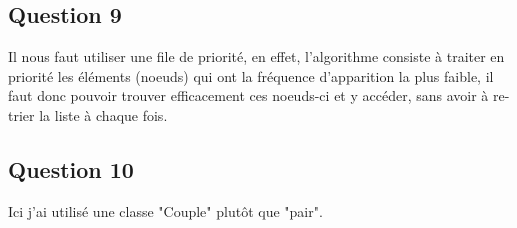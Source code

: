 \documentclass{article}
\begin{document}
\subsection*{Question 9}
Il nous faut utiliser une file de priorité, en effet, l'algorithme consiste à traiter en priorité les éléments (noeuds) qui ont la fréquence d'apparition la plus faible, il faut donc pouvoir trouver efficacement ces noeuds-ci et y accéder, sans avoir à re-trier la liste à chaque fois.

\subsection{Question 10}
Ici j'ai utilisé une classe "Couple" plutôt que "pair". 
\end{document}
